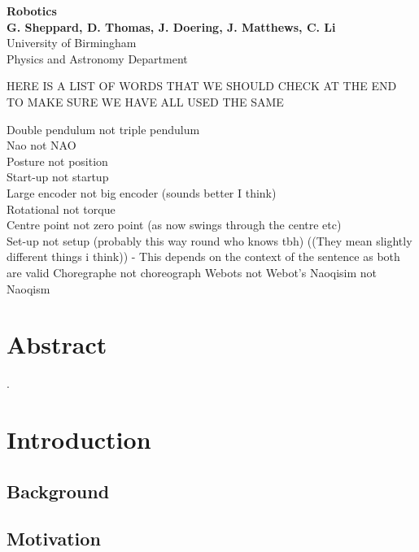 \documentclass[11pt]{article}
\begin{document}
\begin{titlepage}

    \begin{center}
        \vspace*{1cm}
        \Huge
        \textbf{Robotics} \\
        \vspace{0.5cm}
        \LARGE
        \vspace{1.5cm}
        \textbf{G. Sheppard, D. Thomas, J. Doering, J. Matthews, C. Li} \\
        \vfill
        \vspace{0.8cm}
        \Large
        University of Birmingham\\
        Physics and Astronomy Department\\
    \end{center}
\end{titlepage}

\tableofcontents

HERE IS A LIST OF WORDS THAT WE SHOULD CHECK AT THE END TO MAKE SURE WE HAVE ALL USED THE SAME

Double pendulum not triple pendulum \\
Nao not NAO \\
Posture not position\\
Start-up not startup\\
Large encoder not big encoder (sounds better I think)\\
Rotational not torque\\
Centre point not zero point (as now swings through the centre etc)\\
Set-up not setup (probably this way round who knows tbh) ((They mean slightly different things i think)) - This depends on the context of the sentence as both are valid
Choregraphe not choreograph 
Webots not Webot's
Naoqisim not Naoqism 


\section{Abstract}
\cite{Bae2006}.

\section{Introduction}
\subsection{Background}
\subsection{Motivation}
\end{document}
